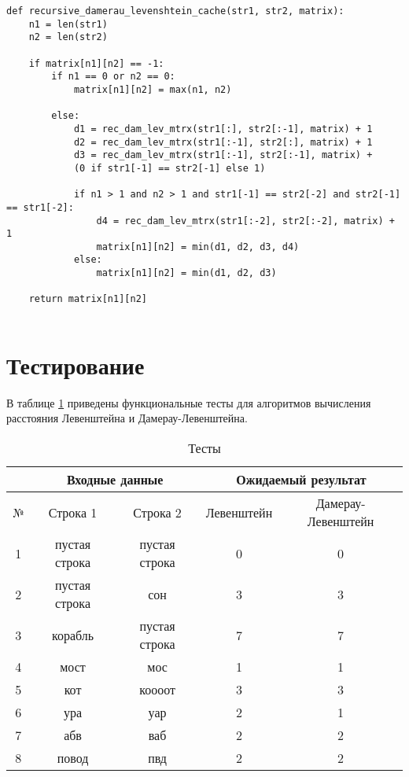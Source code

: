\begin{center}
\captionsetup{justification=raggedright,singlelinecheck=off}
\begin{lstlisting}[label=lst:dl,caption=Рекурсивный алгоритм нахождения расстояния Дамерау-Левенштейна с кешем]
def recursive_damerau_levenshtein_cache(str1, str2, matrix):
	n1 = len(str1)
	n2 = len(str2)
	
	if matrix[n1][n2] == -1:
		if n1 == 0 or n2 == 0:
			matrix[n1][n2] = max(n1, n2)
	
		else:
			d1 = rec_dam_lev_mtrx(str1[:], str2[:-1], matrix) + 1
			d2 = rec_dam_lev_mtrx(str1[:-1], str2[:], matrix) + 1
			d3 = rec_dam_lev_mtrx(str1[:-1], str2[:-1], matrix) +
			(0 if str1[-1] == str2[-1] else 1)
			
			if n1 > 1 and n2 > 1 and str1[-1] == str2[-2] and str2[-1] == str1[-2]:
				d4 = rec_dam_lev_mtrx(str1[:-2], str2[:-2], matrix) + 1
				matrix[n1][n2] = min(d1, d2, d3, d4)
			else:
				matrix[n1][n2] = min(d1, d2, d3)
	
	return matrix[n1][n2]
    
\end{lstlisting} 
\end{center}

\section{Тестирование}

В таблице \ref{tbl:tests} приведены функциональные тесты для алгоритмов вычисления расстояния Левенштейна и Дамерау-Левенштейна.
\\[7\baselineskip]

\begin{table}[!h]
	\begin{center}
        \begin{threeparttable}
        \captionsetup{justification=raggedright,singlelinecheck=off}
		\caption{\label{tbl:tests} Тесты}
		\begin{tabular}{|c|c|c|c|c|}
			\hline
			& \multicolumn{2}{c|}{Входные данные} & \multicolumn{2}{c|}{Ожидаемый результат} \\
			\hline
			№&Строка 1&Строка 2&Левенштейн&Дамерау-Левенштейн\\
			\hline
            1&пустая строка&пустая строка&0&0 \\
            \hline
            2&пустая строка&сон&3&3 \\
            \hline
            3&корабль&пустая строка&7&7 \\
            \hline
            4&мост&мос&1&1 \\
			\hline
			5&кот&коооот&3&3 \\
			\hline
			6&ура&уар&2&1 \\
			\hline
			7&абв&ваб&2&2 \\
			\hline
			8&повод&пвд&2&2 \\
			\hline
		\end{tabular}
        \end{threeparttable}
	\end{center}
\end{table}

